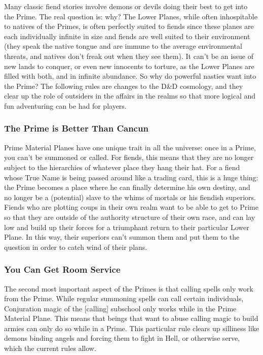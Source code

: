 Many classic fiend stories involve demons or devils doing their best to get into the Prime. The real question is: why? The Lower Planes, while often inhospitable to natives of the Primes, is often perfectly suited to fiends since these planes are each individually infinite in size and fiends are well suited to their environment (they speak the native tongue and are immune to the average environmental threats, and natives don't freak out when they see them). It can't be an issue of new lands to conquer, or even new innocents to torture, as the Lower Planes are filled with both, and in infinite abundance. So why do powerful nasties want into the Prime? The following rules are changes to the D\&D cosmology, and they clear up the role of outsiders in the affairs in the realms so that more logical and fun adventuring can be had for players.

\subsubsection{The Prime is Better Than Cancun}
Prime Material Planes have one unique trait in all the universe: once in a Prime, you can't be summoned or called. For fiends, this means that they are no longer subject to the hierarchies of whatever place they hang their hat. For a fiend whose True Name is being passed around like a trading card, this is a huge thing: the Prime becomes a place where he can finally determine his own destiny, and no longer be a (potential) slave to the whims of mortals or his fiendish superiors. Fiends who are plotting coups in their own realm want to be able to get to Prime so that they are outside of the authority structure of their own race, and can lay low and build up their forces for a triumphant return to their particular Lower Plane. In this way, their superiors can't summon them and put them to the question in order to catch wind of their plans.

\subsubsection{You Can Get Room Service}
The second most important aspect of the Primes is that calling spells only work from the Prime. While regular summoning spells can call certain individuals, Conjuration magic of the [calling] subschool only works while in the Prime Material Plane. This means that beings that want to abuse calling magic to build armies can only do so while in a Prime. This particular rule clears up silliness like demons binding angels and forcing them to fight in Hell, or otherwise serve, which the current rules allow.

